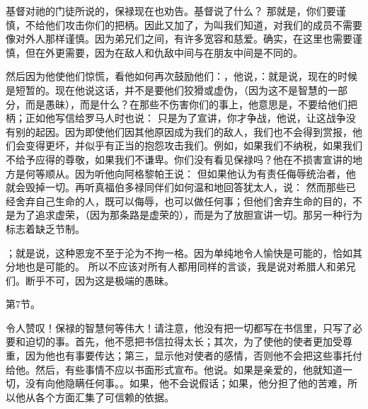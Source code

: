 \par

\par

基督对祂的门徒所说的，保禄现在也劝告。基督说了什么？  那就是，你们要谨慎，不给他们攻击你们的把柄。因此又加了，为叫我们知道，对我们的成员不需要像对外人那样谨慎。因为弟兄们之间，有许多宽容和慈爱。确实，在这里也需要谨慎，但在外更需要，因为在敌人和仇敌中间与在朋友中间是不同的。\par

然后因为他使他们惊慌，看他如何再次鼓励他们：，他说，：就是说，现在的时候是短暂的。现在他说这话，并不是要他们狡猾或虚伪，（因为这不是智慧的一部分，而是愚昧），而是什么？在那些不伤害你们的事上，他意思是，不要给他们把柄；正如他写信给罗马人时也说：  只是为了宣讲，你才争战，他说，让这战争没有别的起因。因为即使他们因其他原因成为我们的敌人，我们也不会得到赏报，他们会变得更坏，并似乎有正当的抱怨攻击我们。例如，如果我们不纳税，如果我们不给予应得的尊敬，如果我们不谦卑。你们没有看见保禄吗？他在不损害宣讲的地方是何等顺从。因为听他向阿格黎帕王说：  但如果他认为有责任侮辱统治者，他就会毁掉一切。再听真福伯多禄同伴们如何温和地回答犹太人，说：  然而那些已经舍弃自己生命的人，既可以侮辱，也可以做任何事；但他们舍弃生命的目的，不是为了追求虚荣，（因为那条路是虚荣的），而是为了放胆宣讲一切。那另一种行为标志着缺乏节制。\par

；就是说，这种恩宠不至于沦为不拘一格。因为单纯地令人愉快是可能的，恰如其分地也是可能的。 所以不应该对所有人都用同样的言谈，我是说对希腊人和弟兄们。断乎不可，因为这是极端的愚昧。\par

第7节。 \par

令人赞叹！保禄的智慧何等伟大！请注意，他没有把一切都写在书信里，只写了必要和迫切的事。首先，他不愿把书信拉得太长；其次，为了使他的使者更加受尊重，因为他也有事要传达；第三，显示他对使者的感情，否则他不会把这些事托付给他。然后，有些事情不应以书面形式宣布。他说。如果是亲爱的，他就知道一切，没有向他隐瞒任何事。。如果，他不会说假话；如果，他分担了他的苦难，所以他从各个方面汇集了可信赖的依据。\par

